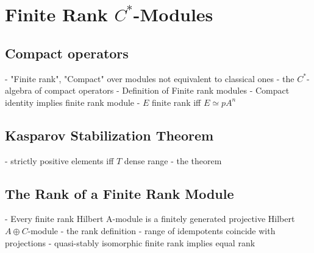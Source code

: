\chapter{Finite Rank \ensuremath{C^*}-Modules}
\label{ch:finite rank}
\section{Compact operators}
- "Finite rank", "Compact" over modules not equivalent to classical ones
- the $C^*$-algebra of compact operators  
- Definition of Finite rank modules
- Compact identity implies finite rank module
- $E$ finite rank iff $E \simeq pA^n$


\section{Kasparov Stabilization Theorem}
- strictly positive elements iff $T$ dense range
- the theorem

\section{The Rank of a Finite Rank Module}
- Every finite rank Hilbert A-module is a finitely generated projective Hilbert $A\oplus C$-module
- the rank definition
- range of idempotents coincide with projections 
- quasi-stably isomorphic finite rank implies equal rank